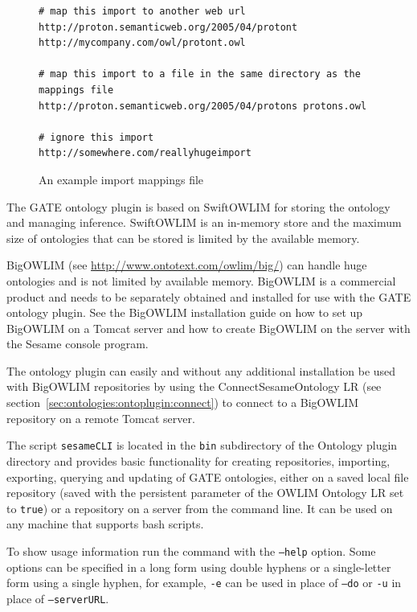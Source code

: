{\begin{figure}[htbp]
\begin{center}
{\begin{small}
\begin{verbatim}
# map this import to another web url
http://proton.semanticweb.org/2005/04/protont http://mycompany.com/owl/protont.owl

# map this import to a file in the same directory as the mappings file
http://proton.semanticweb.org/2005/04/protons protons.owl

# ignore this import
http://somewhere.com/reallyhugeimport
\end{verbatim}\end{small}
}
\caption{An example import mappings file}
\label{fig:importmappingsfile}
\end{center}
\end{figure}



The GATE ontology plugin is based on SwiftOWLIM for storing the
ontology and managing inference. SwiftOWLIM is an in-memory store
and the maximum size of ontologies that can be stored is limited
by the available memory.

BigOWLIM (see \url{http://www.ontotext.com/owlim/big/}) 
can handle huge ontologies and is not limited
by available memory. BigOWLIM is a commercial product and needs
to be separately obtained and installed for use with the GATE
ontology plugin. See the BigOWLIM installation guide on how to 
set up BigOWLIM on a Tomcat server and how to create BigOWLIM on 
the server with the Sesame console program.

The ontology plugin can easily and without any additional installation
 be used with BigOWLIM repositories by
using the ConnectSesameOntology LR (see section~\ref{sec:ontologies:ontoplugin:connect})
to connect to a BigOWLIM repository on a remote Tomcat server. 


The script \texttt{sesameCLI} is located in the \texttt{bin} subdirectory
of the Ontology plugin directory and provides basic functionality for 
creating repositories, importing, exporting, querying and updating of GATE 
ontologies, either on a saved local file repository (saved with the persistent
  parameter of the OWLIM Ontology LR set to \texttt{true}) or a repository on a 
server from the command line. It can be used on any machine that supports 
bash scripts.

To show usage information run the command with the \texttt{--help} option. Some
options can be specified in a long form using double hyphens or a single-letter 
form using a single hyphen, for example, \texttt{-e} can be used in place of
\texttt{--do} or \texttt{-u} in place of \texttt{--serverURL}.

}

